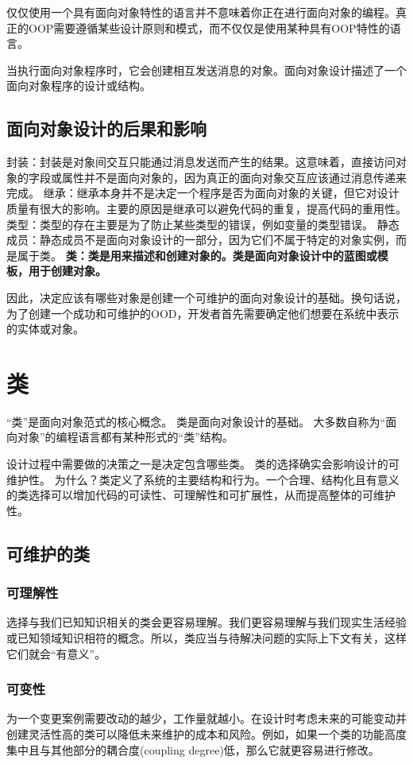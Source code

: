 \documentclass[]{ctexbook}
\begin{document}
仅仅使用一个具有面向对象特性的语言并不意味着你正在进行面向对象的编程。真正的OOP需要遵循某些设计原则和模式，而不仅仅是使用某种具有OOP特性的语言。

当执行面向对象程序时，它会创建相互发送消息的对象。面向对象设计描述了一个面向对象程序的设计或结构。

\subsection{面向对象设计的后果和影响}
封装：封装是对象间交互只能通过消息发送而产生的结果。这意味着，直接访问对象的字段或属性并不是面向对象的，因为真正的面向对象交互应该通过消息传递来完成。
继承：继承本身并不是决定一个程序是否为面向对象的关键，但它对设计质量有很大的影响。主要的原因是继承可以避免代码的重复，提高代码的重用性。
类型：类型的存在主要是为了防止某些类型的错误，例如变量的类型错误。
静态成员：静态成员不是面向对象设计的一部分，因为它们不属于特定的对象实例，而是属于类。
\textbf{类：类是用来描述和创建对象的。类是面向对象设计中的蓝图或模板，用于创建对象。}

因此，决定应该有哪些对象是创建一个可维护的面向对象设计的基础。换句话说，为了创建一个成功和可维护的OOD，开发者首先需要确定他们想要在系统中表示的实体或对象。

\section{类}
“类”是面向对象范式的核心概念。
类是面向对象设计的基础。
大多数自称为“面向对象”的编程语言都有某种形式的“类”结构。

设计过程中需要做的决策之一是决定包含哪些类。
类的选择确实会影响设计的可维护性。
为什么？类定义了系统的主要结构和行为。一个合理、结构化且有意义的类选择可以增加代码的可读性、可理解性和可扩展性，从而提高整体的可维护性。

\subsection{可维护的类}
\subsubsection{可理解性}
选择与我们已知知识相关的类会更容易理解。我们更容易理解与我们现实生活经验或已知领域知识相符的概念。所以，类应当与待解决问题的实际上下文有关，这样它们就会“有意义”。
\subsubsection{可变性}
为一个变更案例需要改动的越少，工作量就越小。在设计时考虑未来的可能变动并创建灵活性高的类可以降低未来维护的成本和风险。例如，如果一个类的功能高度集中且与其他部分的耦合度(coupling degree)低，那么它就更容易进行修改。
\end{document}
